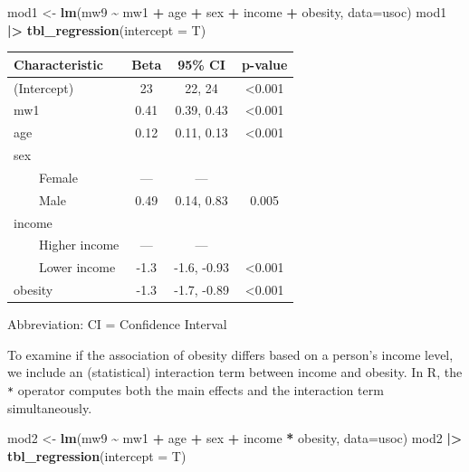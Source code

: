 \documentclass[
]{book}
\newenvironment{Shaded}{\begin{snugshade}}{\end{snugshade}}
\newcommand{\AttributeTok}[1]{\textcolor[rgb]{0.13,0.29,0.53}{#1}}
\newcommand{\FunctionTok}[1]{\textcolor[rgb]{0.13,0.29,0.53}{\textbf{#1}}}
\newcommand{\NormalTok}[1]{#1}
\newcommand{\OtherTok}[1]{\textcolor[rgb]{0.56,0.35,0.01}{#1}}
\newcommand{\SpecialCharTok}[1]{\textcolor[rgb]{0.81,0.36,0.00}{\textbf{#1}}}
\begin{document}
\begin{Shaded}
\begin{Highlighting}[]
\NormalTok{mod1 }\OtherTok{\textless{}{-}} \FunctionTok{lm}\NormalTok{(mw9 }\SpecialCharTok{\textasciitilde{}}\NormalTok{ mw1 }\SpecialCharTok{+}\NormalTok{ age }\SpecialCharTok{+}\NormalTok{ sex }\SpecialCharTok{+}\NormalTok{ income }\SpecialCharTok{+}\NormalTok{ obesity, }\AttributeTok{data=}\NormalTok{usoc)}
\NormalTok{mod1 }\SpecialCharTok{|\textgreater{}} \FunctionTok{tbl\_regression}\NormalTok{(}\AttributeTok{intercept =}\NormalTok{ T)}
\end{Highlighting}
\end{Shaded}

\begin{table}[t]
\fontsize{12.0pt}{14.0pt}\selectfont
\begin{tabular*}{\linewidth}{@{\extracolsep{\fill}}lccc}
\toprule
\textbf{Characteristic} & \textbf{Beta} & \textbf{95\% CI} & \textbf{p-value} \\ 
\midrule\addlinespace[2.5pt]
(Intercept) & 23 & 22, 24 & <0.001 \\ 
mw1 & 0.41 & 0.39, 0.43 & <0.001 \\ 
age & 0.12 & 0.11, 0.13 & <0.001 \\ 
sex &  &  &  \\ 
    Female & — & — &  \\ 
    Male & 0.49 & 0.14, 0.83 & 0.005 \\ 
income &  &  &  \\ 
    Higher income & — & — &  \\ 
    Lower income & -1.3 & -1.6, -0.93 & <0.001 \\ 
obesity & -1.3 & -1.7, -0.89 & <0.001 \\ 
\bottomrule
\end{tabular*}
\begin{minipage}{\linewidth}
\vspace{.05em}
Abbreviation: CI = Confidence Interval\\
\end{minipage}
\end{table}

To examine if the association of obesity differs based on a person's income level, we include an (statistical) interaction term between income and obesity. In R, the \texttt{*} operator computes both the main effects and the interaction term simultaneously.

\begin{Shaded}
\begin{Highlighting}[]
\NormalTok{mod2 }\OtherTok{\textless{}{-}} \FunctionTok{lm}\NormalTok{(mw9 }\SpecialCharTok{\textasciitilde{}}\NormalTok{ mw1 }\SpecialCharTok{+}\NormalTok{ age }\SpecialCharTok{+}\NormalTok{ sex }\SpecialCharTok{+}\NormalTok{ income }\SpecialCharTok{*}\NormalTok{ obesity, }\AttributeTok{data=}\NormalTok{usoc)}
\NormalTok{mod2 }\SpecialCharTok{|\textgreater{}} \FunctionTok{tbl\_regression}\NormalTok{(}\AttributeTok{intercept =}\NormalTok{ T)}
\end{Highlighting}
\end{Shaded}
\end{document}
